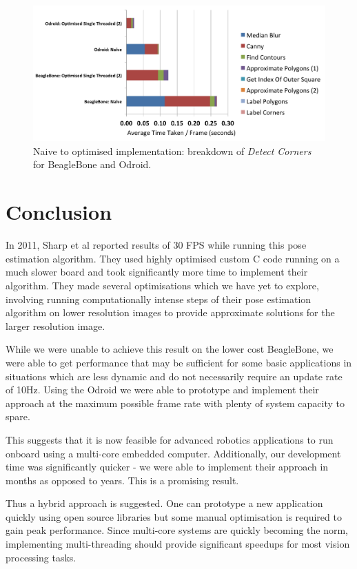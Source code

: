 \documentclass{acm_proc_article-sp}
\begin{document}
\begin{figure}[h!]
\centering
\includegraphics[width=\textwidth]{images/performance/worst-to-best-detect-corners.png}
\caption{Naive to optimised implementation: breakdown of \textit{Detect Corners} for BeagleBone and Odroid.}
\label{fig:best-to-worst-detect-corners}
\end{figure}

\section{Conclusion}
In 2011, Sharp et al \cite{sharp_et_al_2001} reported results of 30 FPS while running this pose estimation algorithm.  They used highly optimised custom C code running on a much slower board and took significantly more time to implement their algorithm. They made several optimisations which we have yet to explore, involving running computationally intense steps of their pose estimation algorithm on lower resolution images to provide approximate solutions for the larger resolution image. 

While we were unable to achieve this result on the lower cost BeagleBone, we were able to get performance that may be sufficient for some basic applications in situations which are less dynamic and do not necessarily require an update rate of 10Hz. Using the Odroid we were able to prototype and implement their approach at the maximum possible frame rate with plenty of system capacity to spare. 

This suggests that it is now feasible for advanced robotics applications to run onboard using a multi-core embedded computer. Additionally, our development time was significantly quicker - we were able to implement their approach in months as opposed to years. This is a promising result.

Thus a hybrid approach is suggested. One can prototype a new application quickly using open source libraries but some manual optimisation is required to gain peak performance. Since multi-core systems are quickly becoming the norm, implementing multi-threading should provide significant speedups for most vision processing tasks.

\printbibliography
\end{document}
